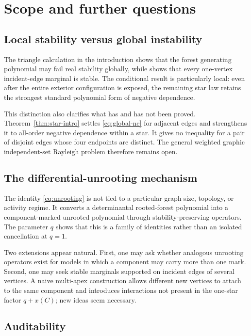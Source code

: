 \documentclass[11pt]{article}
\numberwithin{equation}{section}
\begin{document}
\section{Scope and further questions}\label{sec:discussion}

\subsection{Local stability versus global instability}

The triangle calculation in the introduction shows that the forest generating polynomial may fail real stability globally, while  shows that every one-vertex incident-edge marginal is stable.  The conditional result is particularly local: even after the entire exterior configuration is exposed, the remaining star law retains the strongest standard polynomial form of negative dependence.

This distinction also clarifies what has and has not been proved.  Theorem~\ref{thm:star-intro} settles \eqref{eq:global-nc} for adjacent edges and strengthens it to all-order negative dependence within a star.  It gives no inequality for a pair of disjoint edges whose four endpoints are distinct.  The general weighted graphic independent-set Rayleigh problem therefore remains open.

\subsection{The differential-unrooting mechanism}

The identity \eqref{eq:unrooting} is not tied to a particular graph size, topology, or activity regime.  It converts a determinantal rooted-forest polynomial into a component-marked unrooted polynomial through stability-preserving operators.  The parameter $q$ shows that this is a family of identities rather than an isolated cancellation at $q=1$.

Two extensions appear natural.  First, one may ask whether analogous unrooting operators exist for models in which a component may carry more than one mark.  Second, one may seek stable marginals supported on incident edges of several vertices.  A naive multi-apex construction allows different new vertices to attach to the same component and introduces interactions not present in the one-star factor $q+x(C)$; new ideas seem necessary.

\subsection{Auditability}
\end{document}
